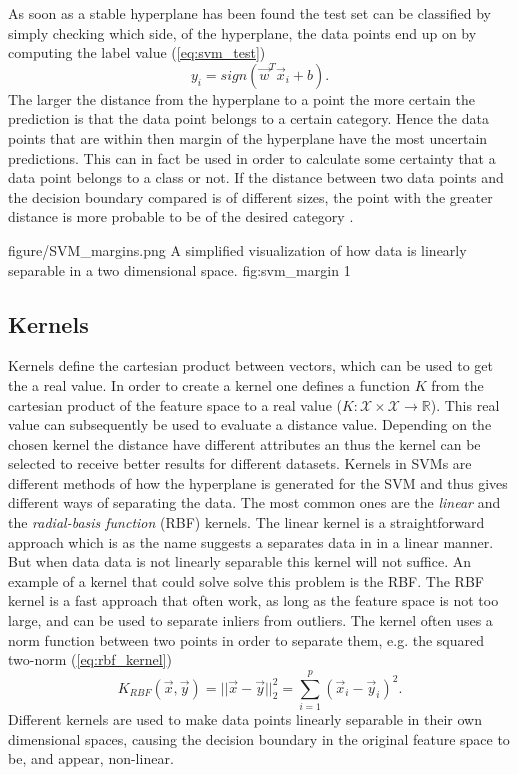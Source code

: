 As soon as a stable hyperplane has been found the test set can be classified by simply checking which side, of the hyperplane, the data points end up on by computing the label value (\ref{eq:svm_test})
\begin{equation}
\label{eq:svm_test}
y_i = sign\left(\vec{w}^T\vec{x}_i+b\right).
\end{equation}
The larger the distance from the hyperplane to a point the more certain the prediction is that the data point belongs to a certain category. Hence the data points that are within then margin of the hyperplane have the most uncertain predictions. This can in fact be used in order to calculate some certainty that a data point belongs to a class or not. If the distance between two data points and the decision boundary compared is of different sizes, the point with the greater distance is more probable to be of the desired category \cite{tong2001support}. 


\singlefigure
{figure/SVM_margins.png}
{A simplified visualization of how data is linearly separable in a two dimensional space.}
{fig:svm_margin}
{1}


\subsection{Kernels}

Kernels define the cartesian product between vectors, which can be used to get the a real value. In order to create a kernel one defines a function $K$ from the cartesian product of the feature space to a real value ($K:\mathcal{X}\times \mathcal{X} \rightarrow \mathbb{R}$). This real value can subsequently be used to evaluate a distance value. Depending on the chosen kernel the distance have different attributes an thus the kernel can be selected to receive better results for different datasets.
Kernels in SVMs are different methods of how the hyperplane is generated for the SVM and thus gives different ways of separating the data.  The most common ones are the \emph{linear} and the \emph{radial-basis function} (RBF) kernels. The linear kernel is a straightforward approach which is as the name suggests a separates data in in a linear manner. 
But when data data is not linearly separable this kernel will not suffice. 
An example of a kernel that could solve solve this problem is the RBF. The RBF kernel is a fast approach that often work, as long as the feature space is not too large, and can be used to separate inliers from outliers. The kernel often uses a norm function between two points in order to separate them, e.g. the squared two-norm  (\ref{eq:rbf_kernel})
\begin{equation}
\label{eq:rbf_kernel}
K_{RBF}(\vec{x},\vec{y}) = ||\vec{x}-\vec{y}||_2 ^2=\sum_{i=1}^p  (\vec{x}_i-\vec{y}_i)^2.
\end{equation}
Different kernels are used to make data points linearly separable in their own dimensional spaces, causing the decision boundary in the original feature space to be, and appear, non-linear.
